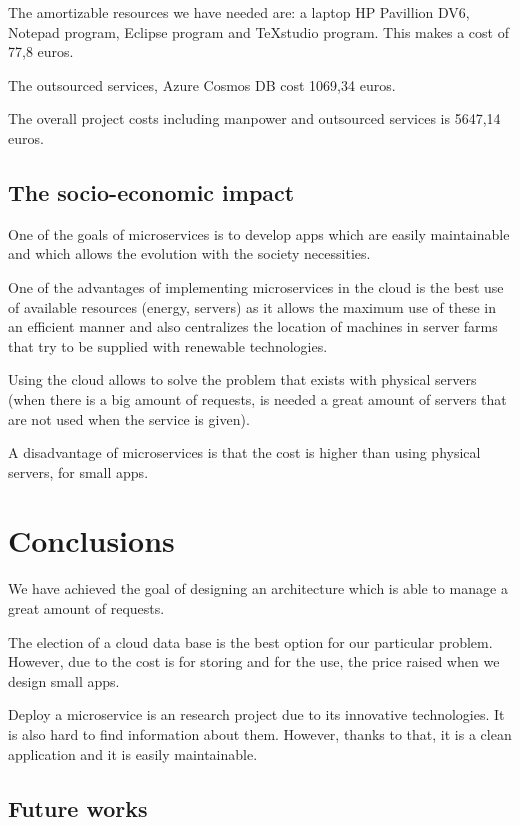 \documentclass[12pt]{report} %
\begin{document}
The amortizable resources we have needed are: a laptop HP Pavillion DV6, Notepad program, Eclipse program and TeXstudio program. This makes a cost of 77,8 euros. 

The outsourced services, Azure Cosmos DB cost 1069,34 euros. 

The overall project costs including manpower and outsourced services is 5647,14 euros.

\subsection{The socio-economic impact}

One of the goals of microservices is to develop apps which are easily maintainable and which allows the evolution with the society necessities.

One of the advantages of implementing microservices in the cloud is the best use of available resources (energy, servers) as it allows the maximum use of these in an efficient manner and also centralizes the location of machines in server farms that try to be supplied with renewable technologies.

Using the cloud allows to solve the problem that exists with physical servers (when there is a big amount of requests, is needed a great amount of servers that are not used when the service is given). 

A disadvantage of microservices is that the cost is higher than using physical servers, for small apps.

\section{Conclusions}

We have achieved the goal of designing an architecture which is able to manage a great amount of requests.

The election of a cloud data base is the best option for our particular problem. However, due to the cost is for storing and for the use, the price raised when we design small apps.

Deploy a microservice is an research project due to its innovative technologies. It is also hard to find information about them. However, thanks to that, it is a clean application and it is easily maintainable. 

\subsection{Future works}
\end{document}
